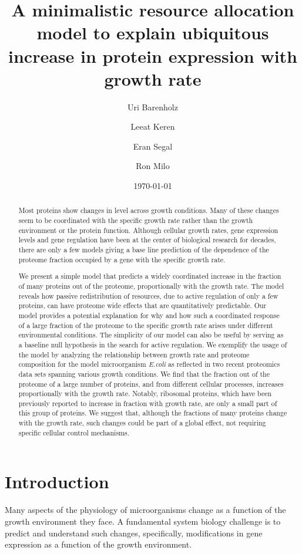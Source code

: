 \documentclass{article}
\title{A minimalistic resource allocation model to explain ubiquitous increase
in protein expression with growth rate}
\author{Uri Barenholz}
\author{Leeat Keren}
\author{Eran Segal}
\author{Ron Milo}
\affil{Weizmann Institute of Science}
\date{\today}
\begin{document}
\maketitle 

\begin{abstract}
Most proteins show changes in level across growth conditions. Many of
these changes seem to be coordinated with the specific growth rate
rather than the growth environment or the protein function. Although
cellular growth rates, gene expression levels and gene regulation have
been at the center of biological research for decades, there are only a
few models giving a base line prediction of the dependence of the
proteome fraction occupied by a gene with the specific growth rate.

We present a simple model that predicts a widely coordinated increase in
the fraction of many proteins out of the proteome, proportionally with
the growth rate. The model reveals how passive redistribution of
resources, due to active regulation of only a few proteins, can have
proteome wide effects that are quantitatively predictable. Our model
provides a potential explanation for why and how such a coordinated
response of a large fraction of the proteome to the specific growth rate
arises under different environmental conditions. The simplicity of our
model can also be useful by serving as a baseline null hypothesis in the
search for active regulation. We exemplify the usage of the model by
analyzing the relationship between growth rate and proteome composition
for the model microorganism \emph{E.coli} as reflected in two recent
proteomics data sets spanning various growth conditions. We find that
the fraction out of the proteome of a large number of proteins, and from
different cellular processes, increases proportionally with the growth
rate. Notably, ribosomal proteins, which have been previously reported
to increase in fraction with growth rate, are only a small part of this
group of proteins. We suggest that, although the fractions of many
proteins change with the growth rate, such changes could be part of a
global effect, not requiring specific cellular control mechanisms.

\end{abstract}




\section{Introduction}
Many aspects of the physiology of microorganisms change as a function of the growth environment they face.
A fundamental system biology challenge is to predict and understand such changes, specifically, modifications in gene expression as a function of the growth environment.
\end{document}
